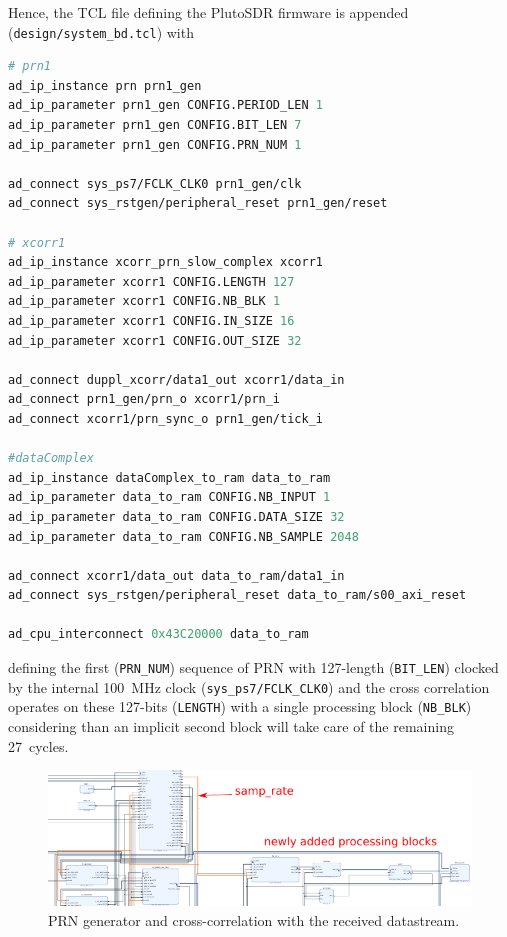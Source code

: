 \documentclass{article}
\begin{document}
Hence, the TCL file defining the PlutoSDR firmware is appended ({\tt design/system\_bd.tcl}) with
\begin{lstlisting}[language=TCL]
# prn1
ad_ip_instance prn prn1_gen
ad_ip_parameter prn1_gen CONFIG.PERIOD_LEN 1
ad_ip_parameter prn1_gen CONFIG.BIT_LEN 7
ad_ip_parameter prn1_gen CONFIG.PRN_NUM 1

ad_connect sys_ps7/FCLK_CLK0 prn1_gen/clk
ad_connect sys_rstgen/peripheral_reset prn1_gen/reset

# xcorr1
ad_ip_instance xcorr_prn_slow_complex xcorr1
ad_ip_parameter xcorr1 CONFIG.LENGTH 127
ad_ip_parameter xcorr1 CONFIG.NB_BLK 1
ad_ip_parameter xcorr1 CONFIG.IN_SIZE 16
ad_ip_parameter xcorr1 CONFIG.OUT_SIZE 32

ad_connect duppl_xcorr/data1_out xcorr1/data_in
ad_connect prn1_gen/prn_o xcorr1/prn_i
ad_connect xcorr1/prn_sync_o prn1_gen/tick_i

#dataComplex
ad_ip_instance dataComplex_to_ram data_to_ram
ad_ip_parameter data_to_ram CONFIG.NB_INPUT 1
ad_ip_parameter data_to_ram CONFIG.DATA_SIZE 32
ad_ip_parameter data_to_ram CONFIG.NB_SAMPLE 2048

ad_connect xcorr1/data_out data_to_ram/data1_in
ad_connect sys_rstgen/peripheral_reset data_to_ram/s00_axi_reset

ad_cpu_interconnect 0x43C20000 data_to_ram
\end{lstlisting}
defining the first ({\tt PRN\_NUM}) sequence of PRN with 127-length ({\tt BIT\_LEN}) clocked
by the internal 100~MHz clock ({\tt sys\_ps7/FCLK\_CLK0}) and the cross correlation
operates on these 127-bits ({\tt LENGTH}) with a single processing block ({\tt NB\_BLK}) considering
than an implicit second block will take care of the remaining 27~cycles.

\begin{figure}[h!tb]
\includegraphics[width=\linewidth]{1xcorr_1PRN_crop.pdf}
\caption{PRN generator and cross-correlation with the received datastream.}
\label{ex1}
\end{figure}
\end{document}
